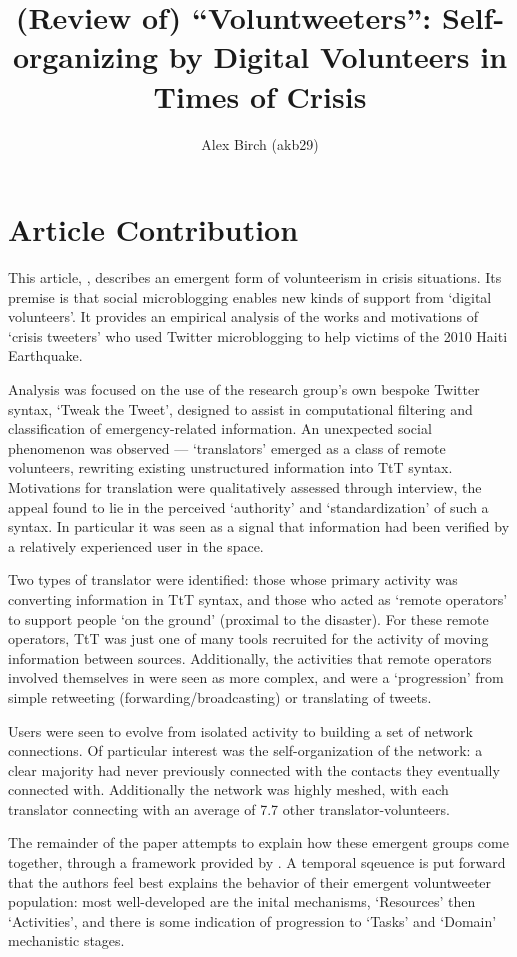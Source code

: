\documentclass[a4paper,12pt]{article}
\title{(Review of) ``Voluntweeters'': Self-organizing by Digital Volunteers in Times of Crisis}
\author{Alex Birch (akb29)}
\begin{document}
\maketitle

\section{Article Contribution}
This article, \cite{Starbird:2011:VSD:1978942.1979102}, describes an emergent form of volunteerism in crisis situations. Its premise is that social microblogging enables new kinds of support from `digital volunteers'. It provides an empirical analysis of the works and motivations of `crisis tweeters' who used Twitter microblogging to help victims of the 2010 Haiti Earthquake.

Analysis was focused on the use of the research group's own bespoke Twitter syntax, `Tweak the Tweet', designed to assist in computational filtering and classification of emergency-related information. An unexpected social phenomenon was observed --- `translators' emerged as a class of remote volunteers, rewriting existing unstructured information into TtT syntax. Motivations for translation were qualitatively assessed through interview, the appeal found to lie in the perceived `authority' and `standardization' of such a syntax. In particular it was seen as a signal that information had been verified by a relatively experienced user in the space.

Two types of translator were identified: those whose primary activity was converting information in TtT syntax, and those who acted as `remote operators' to support people `on the ground' (proximal to the disaster). For these remote operators, TtT was just one of many tools recruited for the activity of moving information between sources. Additionally, the activities that remote operators involved themselves in were seen as more complex, and were a `progression' from simple retweeting (forwarding/broadcasting) or translating of tweets.

Users were seen to evolve from isolated activity to building a set of network connections. Of particular interest was the self-organization of the network: a clear majority had never previously connected with the contacts they eventually connected with. Additionally the network was highly meshed, with each translator connecting with an average of 7.7 other translator-volunteers.

The remainder of the paper attempts to explain how these emergent groups come together, through a framework provided by \citeauthor{kreps1994organizing}. A temporal sqeuence is put forward that the authors feel best explains the behavior of their emergent voluntweeter population: most well-developed are the inital mechanisms, `Resources' then `Activities', and there is some indication of progression to `Tasks' and `Domain' mechanistic stages.
\end{document}
